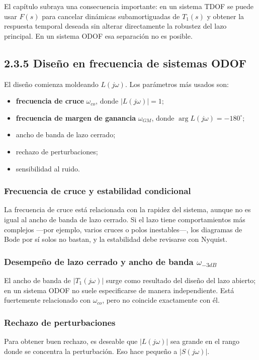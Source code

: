 El capítulo subraya una consecuencia importante: en un sistema TDOF se puede usar \(F(s)\) para cancelar dinámicas subamortiguadas de \(T_1(s)\) y obtener la respuesta temporal deseada sin alterar directamente la robustez del lazo principal. En un sistema ODOF esa separación no es posible.

\subsection{2.3.5 Diseño en frecuencia de sistemas ODOF}
El diseño comienza moldeando \(L(j\omega)\). Los parámetros más usados son:

\begin{itemize}
  \item \textbf{frecuencia de cruce} \(\omega_{co}\), donde \(|L(j\omega)|=1\);
  \item \textbf{frecuencia de margen de ganancia} \(\omega_{GM}\), donde \(\arg L(j\omega)=-180^\circ\);
  \item ancho de banda de lazo cerrado;
  \item rechazo de perturbaciones;
  \item sensibilidad al ruido.
\end{itemize}

\subsubsection{Frecuencia de cruce y estabilidad condicional}
La frecuencia de cruce está relacionada con la rapidez del sistema, aunque no es igual al ancho de banda de lazo cerrado. Si el lazo tiene comportamientos más complejos —por ejemplo, varios cruces o polos inestables—, los diagramas de Bode por sí solos no bastan, y la estabilidad debe revisarse con Nyquist.

\subsubsection{Desempeño de lazo cerrado y ancho de banda \(\omega_{-3dB}\)}
El ancho de banda de \(|T_1(j\omega)|\) surge como resultado del diseño del lazo abierto; en un sistema ODOF no suele especificarse de manera independiente. Está fuertemente relacionado con \(\omega_{co}\), pero no coincide exactamente con él.

\subsubsection{Rechazo de perturbaciones}
Para obtener buen rechazo, es deseable que \(|L(j\omega)|\) sea grande en el rango donde se concentra la perturbación. Eso hace pequeño a \(|S(j\omega)|\).

